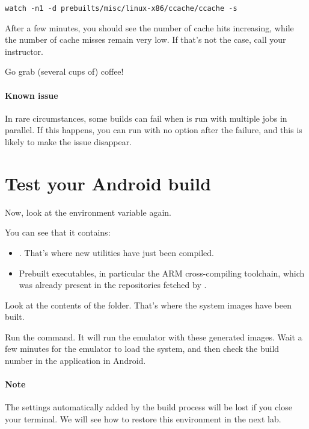 \begin{verbatim}
watch -n1 -d prebuilts/misc/linux-x86/ccache/ccache -s
\end{verbatim}

After a few minutes, you should see the number of cache hits
increasing, while the number of cache misses remain very low. If
that's not the case, call your instructor.

Go grab (several cups of) coffee!

\paragraph{Known issue}
In rare circumstances, some builds can fail when  is run
with multiple jobs in parallel. If this happens, you can run
 with no option after the failure, and this is likely to
make the issue disappear.

\section{Test your Android build}

Now, look at the  environment variable again.

You can see that it contains:
\begin{itemize}
\item
  .
  That's where new utilities have just been compiled.
\item Prebuilt executables, in particular the ARM cross-compiling
  toolchain, which was already present in the repositories fetched by
  .
\end{itemize}

Look at the contents of the  folder.
That's where the system images have been built.

Run the  command. It will run the emulator with these
generated images.  Wait a few minutes for the emulator to load the
system, and then check the build number in the 
application in Android.

\paragraph{Note}
The  settings automatically added by the build process will
be lost if you close your terminal. We will see how to restore this
environment in the next lab.

